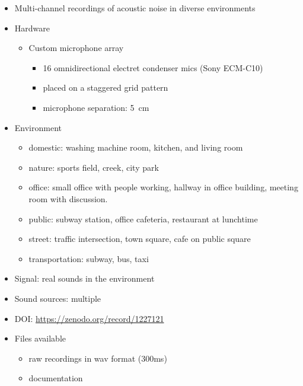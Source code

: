 \documentclass[14pt, oneside]{extarticle}
\begin{document}
\begin{itemize}

\item Multi-channel recordings of acoustic noise in diverse environments \cite{thiemann2013demand}

\item Hardware
	\begin{itemize}
	\item Custom microphone array
		\begin{itemize}
		\item 16 omnidirectional electret condenser mics (Sony ECM-C10) 
		\item placed on a staggered grid pattern 
		\item microphone separation: \SI{5}{\centi\metre}
		\end{itemize}
	\end{itemize}

\item Environment
	\begin{itemize}
	\item domestic: washing machine room, kitchen, and living room
	\item nature: sports field, creek, city park
	\item office: small office with people working, hallway in office building, meeting room with discussion.
	\item public: subway station, office cafeteria, restaurant at lunchtime
	\item street: traffic intersection, town square, cafe on public square
	\item transportation: subway, bus, taxi
	\end{itemize}

\item Signal: real sounds in the environment

\item Sound sources: multiple

\item DOI: \href{10.5281/zenodo.1227121}{https://zenodo.org/record/1227121} 

\item Files available
	\begin{itemize}
	\item raw recordings in wav format (300ms)
	\item documentation
	\end{itemize}

\end{itemize}
\end{document}
